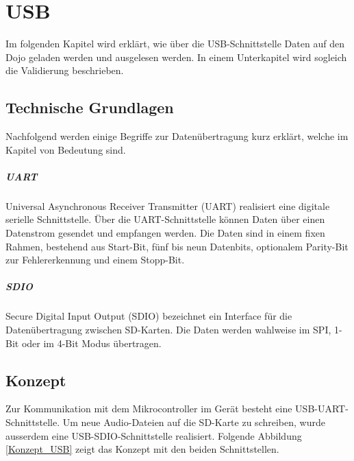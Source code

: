 \chapter{USB}
\label{USB}
\thispagestyle{fancy}  

Im folgenden Kapitel wird erklärt, wie über die USB-Schnittstelle Daten auf den Dojo geladen werden und ausgelesen werden. In einem Unterkapitel wird sogleich die Validierung beschrieben. 

\section{Technische Grundlagen}

Nachfolgend werden einige Begriffe zur Datenübertragung kurz erklärt, welche im Kapitel von Bedeutung sind.

\paragraph{UART}
Universal Asynchronous Receiver Transmitter (UART) realisiert eine digitale serielle Schnittstelle. Über die UART-Schnittstelle können Daten über einen Datenstrom gesendet und empfangen werden. Die Daten sind in einem fixen Rahmen, bestehend aus Start-Bit, fünf bis neun Datenbits, optionalem Parity-Bit zur Fehlererkennung und einem Stopp-Bit.

\paragraph{SDIO}
Secure Digital Input Output (SDIO) bezeichnet ein Interface für die Datenübertragung zwischen SD-Karten. Die Daten werden wahlweise im SPI, 1-Bit oder im 4-Bit Modus übertragen.

\section{Konzept}

Zur Kommunikation mit dem Mikrocontroller im Gerät besteht eine USB-UART-Schnittstelle. Um neue Audio-Dateien auf die SD-Karte zu schreiben, wurde ausserdem eine USB-SDIO-Schnittstelle realisiert. Folgende Abbildung \ref{Konzept_USB} zeigt das Konzept mit den beiden Schnittstellen.

